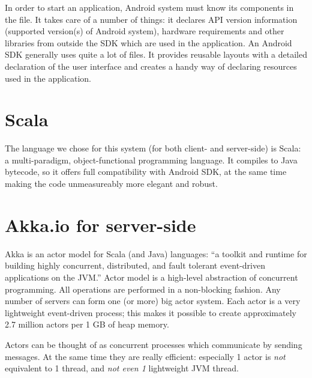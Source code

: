 In order to start an application, Android system must know its components in the  file. It takes care of a number of things: it declares API version information (supported version(s) of Android system), hardware requirements and other libraries from outside the SDK which are used in the application. An Android SDK generally uses quite a lot of  files. It provides reusable layouts with a detailed declaration of the user interface and creates a handy way of declaring resources used in the application.

\section{Scala}
\label{sec:scala}

The language we chose for this system (for both client- and server-side) is Scala: a multi-paradigm, object-functional programming language. It compiles to Java bytecode, so it offers full compatibility with Android SDK, at the same time making the code unmeasureably more elegant and robust. \cite{Odersky:2008:Programming}


\section{Akka.io for server-side}
\label{sec:akka}

Akka is an actor model for Scala (and Java) languages: ``a toolkit and runtime for building highly concurrent, distributed, and fault tolerant event-driven applications on the JVM.'' Actor model is a high-level abstraction of concurrent programming. All operations are performed in a non-blocking fashion. Any number of servers can form one (or more) big actor system. Each actor is a very lightweight event-driven process; this makes it possible to create approximately 2.7 million actors per 1 GB of heap memory. \cite{Akka:2013:Docs}

Actors can be thought of as concurrent processes which communicate by sending messages. At the same time they are really efficient: especially 1 actor is \emph{not} equivalent to 1 thread, and \emph{not even 1} lightweight JVM thread.
